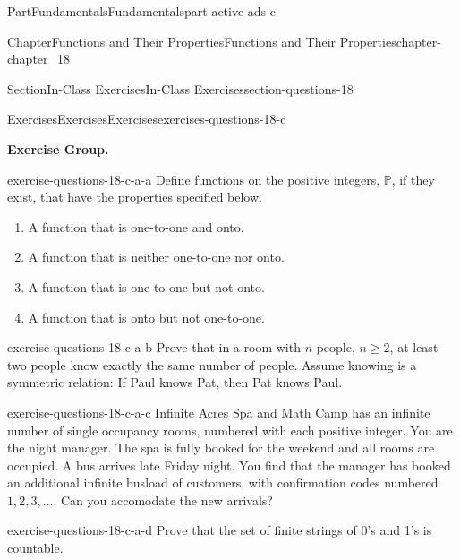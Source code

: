 \documentclass[oneside,10pt,]{book}
\numberwithin{equation}{section}
\begin{document}
\begin{partptx}{Part}{Fundamentals}{}{Fundamentals}{}{}{part-active-ads-c}
\begin{chapterptx}{Chapter}{Functions and Their Properties}{}{Functions and Their Properties}{}{}{chapter-chapter_18}
%
\begin{sectionptx}{Section}{In-Class Exercises}{}{In-Class Exercises}{}{}{section-questions-18}
%
%
%
\typeout{************************************************}
\typeout{************************************************}
%
\begin{exercises-subsection-numberless}{Exercises}{Exercises}{}{Exercises}{}{}{exercises-questions-18-c}
\par\medskip\noindent%
\textbf{Exercise Group.}\space\space%
\begin{exercisegroup}
\begin{divisionexerciseeg}{1}{}{}{exercise-questions-18-c-a-a}%
Define functions on the positive integers, \(\mathbb{P}\), if they exist, that have the properties specified below.%
\begin{enumerate}[label=(\alph*)]
\item{}A function that is one-to-one and onto.%
\item{}A function that is neither one-to-one nor onto.%
\item{}A function that is one-to-one but not onto.%
\item{}A function that is onto but not one-to-one.%
\end{enumerate}
%
\end{divisionexerciseeg}%
\begin{divisionexerciseeg}{2}{}{}{exercise-questions-18-c-a-b}%
Prove that in a room with \(n\) people, \(n \geq 2\), at least two people know exactly the same number of people. Assume knowing is a symmetric relation: If Paul knows Pat, then Pat knows Paul.%
\end{divisionexerciseeg}%
\begin{divisionexerciseeg}{3}{}{}{exercise-questions-18-c-a-c}%
Infinite Acres Spa and Math Camp has an infinite number of single occupancy rooms, numbered with each positive integer.  You are the night manager.  The spa is fully booked for the weekend and all rooms are occupied. A bus arrives late Friday night.  You find that the manager has booked an additional infinite busload of customers, with confirmation codes numbered \(1, 2, 3, \dots\).   Can you accomodate the new arrivals?%
\end{divisionexerciseeg}%
\begin{divisionexerciseeg}{4}{}{}{exercise-questions-18-c-a-d}%
Prove that the set of finite strings of 0's and 1's is countable.%
\end{divisionexerciseeg}%
\end{exercisegroup}

\end{exercises-subsection-numberless}
\end{sectionptx}
\end{chapterptx}
\end{partptx}
\end{document}
